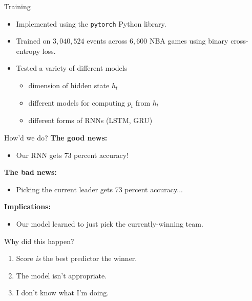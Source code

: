 \begin{frame}{Training}
	\begin{itemize}[<+->]
		\item Implemented using the \texttt{pytorch} Python library.

		      \medskip

		\item Trained on $3,040,524$ events across $6,600$ NBA games using binary cross-entropy loss.

		      \medskip

		\item Tested a variety of different models
		      \begin{itemize}
			      \item dimension of hidden state $h_t$
			      \item different models for computing $p_t$ from $h_t$
			      \item different forms of RNNs (LSTM, GRU)
		      \end{itemize}
	\end{itemize}
\end{frame}

\begin{frame}{How'd we do?}
	\textbf{The good news:}
	\begin{itemize}
		\item Our RNN gets 73 percent accuracy!
	\end{itemize}

	\bigskip \pause

	\textbf{The bad news:}
	\begin{itemize}
		\item Picking the current leader gets 73 percent accuracy...
	\end{itemize}

	\bigskip \pause

	\textbf{Implications:}
	\begin{itemize}
		\item Our model learned to just pick the currently-winning team.
	\end{itemize}
\end{frame}

\begin{frame}{Why did this happen?}
	\begin{enumerate}[<+->]
		\item Score \emph{is} the best predictor the winner.
		\item The model isn't appropriate.
		\item I don't know what I'm doing.
	\end{enumerate}
\end{frame}

